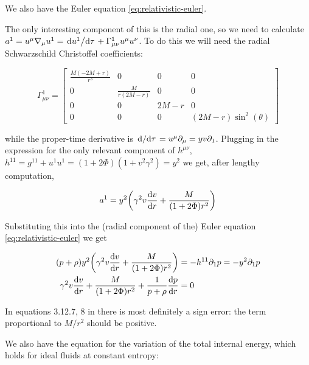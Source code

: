\documentclass[main.tex]{subfiles}
\begin{document}
We also have the Euler equation \eqref{eq:relativistic-euler}.

The only interesting component of this is the radial one, so we need to calculate \(a^1 = u^\mu \nabla_\mu u^1 = \dv*{u^1}{\tau} + \Gamma^1_{\mu \nu} u^\mu u^\nu \). To do this we will need the radial Schwarzschild Christoffel coefficients:

\begin{equation}
  \Gamma^1_{\mu \nu} = \left[\begin{matrix}\frac{M \left(- 2 M + r\right)}{r^{3}} & 0 & 0 & 0\\0 & \frac{M}{r \left(2 M - r\right)} & 0 & 0\\0 & 0 & 2 M - r & 0\\0 & 0 & 0 & \left(2 M - r\right) \sin^{2}{\left(\theta \right)}\end{matrix}\right]
\end{equation}

while the proper-time derivative is \(\dv*{}{\tau} = u^\mu \partial_\mu = yv\partial_1\).
Plugging in the expression for the only relevant component of \(h^{\mu\nu}\), \(h^{11} = g^{11} + u^1 u^1 = (1 + 2 \Phi) (1 + v^2 \gamma^2) = y^2\)
we get, after lengthy computation,

\begin{equation}
  a^1 = y^2 \qty(\gamma^2 v \dv{v}{r} + \frac{M}{(1+ 2 \Phi) r^2})
\end{equation}

Substituting this into the (radial component of the) Euler equation \eqref{eq:relativistic-euler} we get

\begin{subequations}
\begin{align}
  (p + \rho) y^2 \qty(\gamma^2 v \dv{v}{r} + \frac{M}{(1+ 2 \Phi) r^2}) &= - h^{1 1} \partial_1 p = - y^2 \partial_1 p \\
   \gamma^2 v \dv{v}{r} + \frac{M}{(1+ 2 \Phi) r^2} + \frac{1}{p + \rho} \dv{p}{r} &= 0
  \label{eq:ideal-euler}
\end{align}
\end{subequations}

\begin{greenbox}
  In equations 3.12.7, 8 in \cite{Nobili:2000} there is most definitely a sign error: the term proportional to \(M/r^2\) should be positive.
\end{greenbox}

We also have the equation for the variation of the total internal energy, which holds for ideal fluids at constant entropy:
\end{document}
